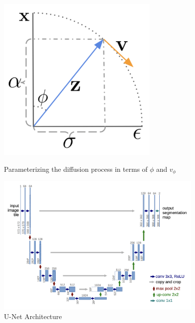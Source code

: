 \documentclass[conference]{IEEEtran}
\begin{document}
\begin{figure}[H]
   \begin{minipage}{0.50\textwidth}
        \centering
        \includegraphics[width=0.7\textwidth]{figures/figure2.png}
        \caption{Parameterizing the diffusion process in terms of $\phi $ and $v_\phi$}
        \label{fig:fig2}
    \end{minipage}
    \begin{minipage}{0.50\textwidth}
        \centering
        \includegraphics[width=0.9\textwidth]{figures/figure3.png}
        \caption{U-Net Architecture} \label{fig:fig3}
    \end{minipage}
\end{figure} \FloatBarrier
\end{document}
